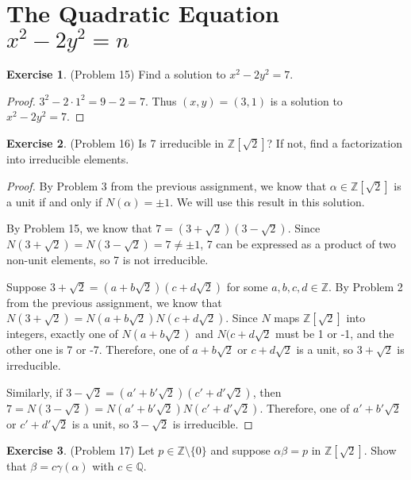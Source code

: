 \documentclass[12pt, psamsfonts]{amsart}
\theoremstyle{definition}
\newtheorem*{exer}{Exercise}
\theoremstyle{remark}
\numberwithin{equation}{section}
\begin{document}
\section{The Quadratic Equation $x^2 - 2y^2 = n$}
\begin{exer}{(Problem 15)}
  Find a solution to $x^2 - 2y^2 = 7$.
\end{exer}

\begin{proof}
  $3^2 - 2 \cdot 1^2 = 9 - 2 = 7$.
  Thus $(x, y) = (3, 1)$ is a solution to $x^2 - 2y^2 = 7$.
\end{proof}

\begin{exer}{(Problem 16)}
  Is 7 irreducible in $\mathbb{Z}[\sqrt{2}]$?
  If not, find a factorization into irreducible elements.
\end{exer}

\begin{proof}
  By Problem 3 from the previous assignment, we know that $\alpha \in \mathbb{Z}[\sqrt{2}]$ is a unit if and only if $N(\alpha) = \pm 1$.
  We will use this result in this solution.

  By Problem 15, we know that $7 = (3 + \sqrt{2})(3 - \sqrt{2})$.
  Since $N(3 + \sqrt{2}) = N(3 - \sqrt{2}) = 7 \ne \pm 1$, 7 can be expressed as a product of two non-unit elements, so 7 is not irreducible.

  Suppose $3 + \sqrt{2} = (a + b\sqrt{2})(c + d\sqrt{2})$ for some $a, b, c, d \in \mathbb{Z}$.
  By Problem 2 from the previous assignment, we know that $N(3 + \sqrt{2}) = N(a + b\sqrt{2})N(c + d\sqrt{2})$.
  Since $N$ maps $\mathbb{Z}[\sqrt{2}]$ into integers, exactly one of $N(a + b\sqrt{2})$ and $N(c + d\sqrt{2}$ must be 1 or -1, and the other one is 7 or -7.
  Therefore, one of $a + b\sqrt{2}$ or $c + d\sqrt{2}$ is a unit, so $3 + \sqrt{2}$ is irreducible.

  Similarly, if $3 - \sqrt{2} = (a' + b'\sqrt{2})(c' + d'\sqrt{2})$, then $7 = N(3 - \sqrt{2}) = N(a' + b'\sqrt{2})N(c' + d'\sqrt{2})$.
  Therefore, one of $a' + b'\sqrt{2}$ or $c' + d'\sqrt{2}$ is a unit, so $3 - \sqrt{2}$ is irreducible.
\end{proof}

\begin{exer}{(Problem 17)}
  Let $p \in \mathbb{Z} \setminus \{ 0 \}$ and suppose $\alpha\beta = p$ in $\mathbb{Z}[\sqrt{2}]$.
  Show that $\beta = c\gamma(\alpha)$ with $c \in \mathbb{Q}$.
\end{exer}
\end{document}
